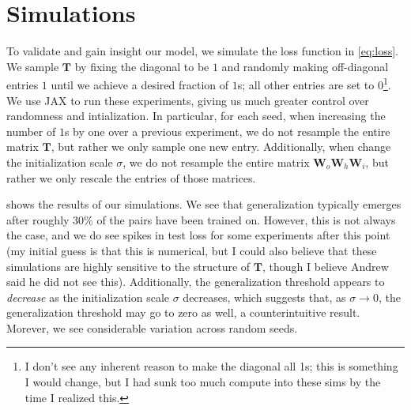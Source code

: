 \documentclass{article}
\begin{document}
\section{Simulations}
\FloatBarrier
To validate and gain insight our model, we simulate the loss function in \cref{eq:loss}.
We sample $\bm{T}$ by fixing the diagonal to be $1$ and randomly making off-diagonal entries $1$ until we achieve a desired fraction of $1$s; all other entries are set to $0$\footnote{I don't see any inherent reason to make the diagonal all 1s; this is something I would change, but I had sunk too much compute into these sims by the time I realized this.}.
We use JAX to run these experiments, giving us much greater control over randomness and intialization.
In particular, for each seed, when increasing the number of $1$s by one over a previous experiment, we do not resample the entire matrix $\bm{T}$, but rather we only sample one new entry.
Additionally, when change the initialization scale $\sigma$, we do not resample the entire matrix $\bm{W}_o \bm{W}_h \bm{W}_i$, but rather we only rescale the entries of those matrices.

 shows the results of our simulations.
We see that generalization typically emerges after roughly 30\% of the pairs have been trained on.
However, this is not always the case, and we do see spikes in test loss for some experiments after this point (my initial guess is that this is numerical, but I could also believe that these simulations are highly sensitive to the structure of $\bm{T}$, though I believe Andrew said he did not see this).
Additionally, the generalization threshold appears to \emph{decrease} as the initialization scale $\sigma$ decreases, which suggests that, as $\sigma \to 0$, the generalization threshold may go to zero as well, a counterintuitive result.
Morever, we see considerable variation across random seeds.
\end{document}
